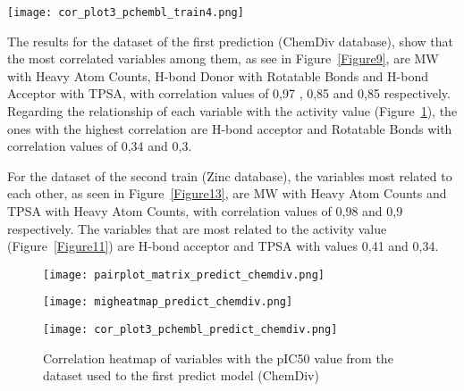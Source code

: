 \documentclass[final,times,twocolumn,article]{elsarticle}
\begin{document}
\begin{figure*}
    \centering 
     \texttt{[image: cor\_plot3\_pchembl\_train4.png]}	
     \caption{Correlation heatmap of variables with the pIC50 value from the dataset used to train the model} 
     \label{Figure8}
 \end{figure*}

 The results for the dataset of the first prediction (ChemDiv database), show that the most correlated variables among them, as see in Figure~\ref{Figure9}, are MW with Heavy Atom Counts, H-bond Donor with Rotatable Bonds and H-bond Acceptor with TPSA, with correlation values of 0,97 , 0,85 and 0,85 respectively. Regarding the relationship of each variable with the activity value (Figure~\ref{Figure10}), the ones with the highest correlation are H-bond acceptor and Rotatable Bonds with correlation values of 0,34 and 0,3. 

 For the dataset of the second train (Zinc database), the variables most related to each other, as seen in Figure~\ref{Figure13}, are MW with Heavy Atom Counts and TPSA with Heavy Atom Counts, with correlation values of 0,98 and 0,9 respectively. The variables that are most related to the activity value (Figure~\ref{Figure11}) are H-bond acceptor and TPSA with values 0,41 and 0,34. 

\begin{figure*}
    \begin{subfigure}{0.6\textwidth}
        \texttt{[image: pairplot\_matrix\_predict\_chemdiv.png]} 
        \caption{}
    \end{subfigure}
    \hfill
    \begin{subfigure}{0.6\textwidth}
        \texttt{[image: migheatmap\_predict\_chemdiv.png]}
        \caption{}
    \end{subfigure}
    
    \caption{Correlation analysis of the features to determine if there is any correlation pattern among them. Results of the first predicted model (ChemDiv). (a)Pariplot correlation matrix (b)Correlation matrix heatmap}
    \label{Figure9}
\end{figure*}

\begin{figure}[h]
    \centering 
     \texttt{[image: cor\_plot3\_pchembl\_predict\_chemdiv.png]}	
     \caption{Correlation heatmap of variables with the pIC50 value from the dataset used to the first predict model (ChemDiv)} 
     \label{Figure10}
 \end{figure}
\end{document}
